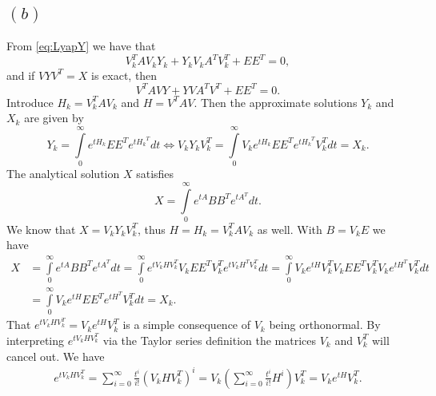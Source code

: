 \subsection*{$(b)$}
From \eqref{eq:LyapY} we have that
\begin{equation*}
V_{k}^{T}AV_{k}Y_{k}+Y_{k}V_{k}A^{T}V_{k}^{T} + EE^{T} = 0,
\end{equation*}
and if $VYV^{T} = X$ is exact, then
\begin{equation*}
V^{T}AVY+YVA^{T}V^{T} + EE^{T} = 0.
\end{equation*}
Introduce $H_{k} = V_{k}^{T}AV_{k}$ and $H = V^{T}AV$. Then the approximate solutions $Y_{k}$ and
$X_{k}$ are given by
\begin{equation*}
Y_{k} =  \int\limits_{0}^{\infty}e^{tH_{k}}EE^{T}e^{{tH_{k}}^{T}}dt \Leftrightarrow V_{k}Y_{k}V_{k}^{T} =  \int\limits_{0}^{\infty}V_{k}e^{tH_{k}}EE^{T}e^{{tH_{k}}^{T}}V_{k}^{T}dt = X_{k}.
\end{equation*}
The analytical solution $X$ satisfies
\begin{equation*}
X =  \int\limits_{0}^{\infty}e^{tA}BB^{T}e^{{tA}^{T}}dt.
\end{equation*}
We know that $X = V_{k}Y_{k}V_{k}^{T}$, thus $H = H_{k} = V_{k}^{T}AV_{k}$ as well. With $B = V_{k}E$ we have
\begin{align*}
X &=  \int\limits_{0}^{\infty}e^{tA}BB^{T}e^{{tA}^{T}}dt =
\int\limits_{0}^{\infty}e^{tV_{k}HV_{k}^{T}}V_{k}EE^{T}V_{k}^{T}e^{tV_{k}H^{T}V_{k}^{T}}dt = \int\limits_{0}^{\infty}V_{k}e^{tH}V_{k}^{T}V_{k}EE^{T}V_{k}^{T}V_{k}e^{{tH}^{T}}V_{k}^{T}dt\\
&=\int\limits_{0}^{\infty}V_{k}e^{tH}EE^{T}e^{{tH}^{T}}V_{k}^{T}dt = X_{k}.
\end{align*}
That $e^{tV_{k}HV_{k}^{T}} = V_{k}e^{tH}V_{k}^{T}$ is a simple consequence of $V_{k}$ being orthonormal. By interpreting $e^{tV_{k}HV_{k}^{T}}$ via the Taylor series definition the matrices  $V_{k}$ and $V_{k}^{T}$ will cancel out. We have
\begin{align*}
  e^{tV_{k}HV_{k}^{T}} = \sum\limits_{i = 0}^{\infty}\frac{t^{i}}{i!}(V_{k}HV_{k}^{T})^{i}=V_{k}\left(\sum\limits_{i = 0}^{\infty}\frac{t^{i}}{i!}H^{i}\right)V_{k}^{T} = V_{k}e^{tH}V_{k}^{T}.
\end{align*}


